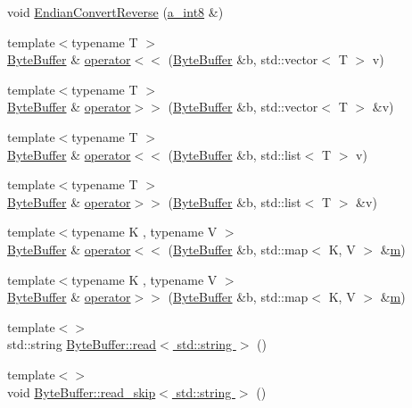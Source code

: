 \begin{DoxyCompactItemize}
\item 
void \hyperlink{namespace_agmd_network_af770a52df1f1b99b1d8bebbe589b21d0}{Endian\+Convert\+Reverse} (\hyperlink{_common_defines_8h_a29a7f712ca0e13d1cc6485d440fd7ca5}{a\+\_\+int8} \&)
\item 
{\footnotesize template$<$typename T $>$ }\\\hyperlink{class_agmd_network_1_1_byte_buffer}{Byte\+Buffer} \& \hyperlink{namespace_agmd_network_a1b6b414b745a2f95cbe6ed153ca9c968}{operator$<$$<$} (\hyperlink{class_agmd_network_1_1_byte_buffer}{Byte\+Buffer} \&b, std\+::vector$<$ T $>$ v)
\item 
{\footnotesize template$<$typename T $>$ }\\\hyperlink{class_agmd_network_1_1_byte_buffer}{Byte\+Buffer} \& \hyperlink{namespace_agmd_network_aade20a128045f42c9b50ca9612149fef}{operator$>$$>$} (\hyperlink{class_agmd_network_1_1_byte_buffer}{Byte\+Buffer} \&b, std\+::vector$<$ T $>$ \&v)
\item 
{\footnotesize template$<$typename T $>$ }\\\hyperlink{class_agmd_network_1_1_byte_buffer}{Byte\+Buffer} \& \hyperlink{namespace_agmd_network_a24e111d911861a44f287dce3abb79817}{operator$<$$<$} (\hyperlink{class_agmd_network_1_1_byte_buffer}{Byte\+Buffer} \&b, std\+::list$<$ T $>$ v)
\item 
{\footnotesize template$<$typename T $>$ }\\\hyperlink{class_agmd_network_1_1_byte_buffer}{Byte\+Buffer} \& \hyperlink{namespace_agmd_network_a9a0459aae258ac47a2e9c2797eb308fd}{operator$>$$>$} (\hyperlink{class_agmd_network_1_1_byte_buffer}{Byte\+Buffer} \&b, std\+::list$<$ T $>$ \&v)
\item 
{\footnotesize template$<$typename K , typename V $>$ }\\\hyperlink{class_agmd_network_1_1_byte_buffer}{Byte\+Buffer} \& \hyperlink{namespace_agmd_network_a30c0870f1dbd862f97442c4f0af81efa}{operator$<$$<$} (\hyperlink{class_agmd_network_1_1_byte_buffer}{Byte\+Buffer} \&b, std\+::map$<$ K, V $>$ \&\hyperlink{_examples_2_bezier_2_app_8cpp_a294c40564f429c5e459798a778ea2adf}{m})
\item 
{\footnotesize template$<$typename K , typename V $>$ }\\\hyperlink{class_agmd_network_1_1_byte_buffer}{Byte\+Buffer} \& \hyperlink{namespace_agmd_network_a2658160a681faa3a85e2dee26e138d4a}{operator$>$$>$} (\hyperlink{class_agmd_network_1_1_byte_buffer}{Byte\+Buffer} \&b, std\+::map$<$ K, V $>$ \&\hyperlink{_examples_2_bezier_2_app_8cpp_a294c40564f429c5e459798a778ea2adf}{m})
\item 
{\footnotesize template$<$$>$ }\\std\+::string \hyperlink{namespace_agmd_network_ae6866b9da4f774b45ca83c247aecd3f8}{Byte\+Buffer\+::read$<$ std\+::string $>$} ()
\item 
{\footnotesize template$<$$>$ }\\void \hyperlink{namespace_agmd_network_a4b2514d172a6ea4aaf29538b9dd5858c}{Byte\+Buffer\+::read\+\_\+skip$<$ std\+::string $>$} ()
\end{DoxyCompactItemize}


